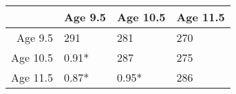 \begin{table}[ht]
\centering
\begin{tabular}{rlll}
  \hline
 & Age 9.5 & Age 10.5 & Age 11.5 \\ 
  \hline
Age 9.5 & 291 & 281 & 270 \\ 
  Age 10.5 &  0.91*  & 287 & 275 \\ 
  Age 11.5 &  0.87*  &  0.95*  & 286 \\ 
   \hline
\end{tabular}
\end{table}

